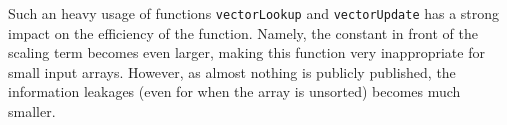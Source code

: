 \documentclass[11pt]{article}
\newcommand{\ct}[1]{\texttt{#1}}
\begin{document}
Such an heavy usage of functions \ct{vectorLookup} and \ct{vectorUpdate} has a strong impact on the efficiency of the function. Namely, the constant in front of the scaling term becomes even larger, making this function very inappropriate for small input arrays. However, as almost nothing is publicly published, the information leakages (even for when the array is unsorted) becomes much smaller.  









% 
\end{document}
